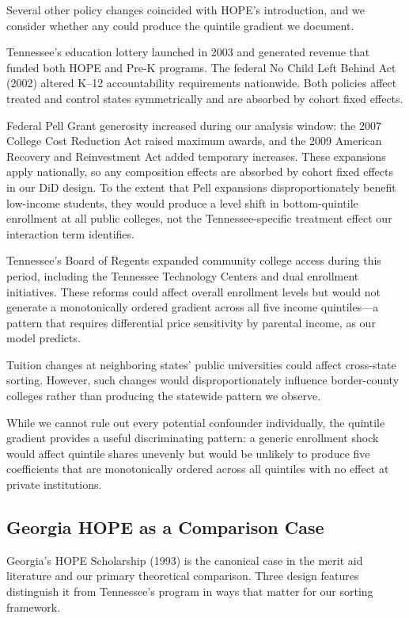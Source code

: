 Several other policy changes coincided with HOPE's introduction, and we
consider whether any could produce the quintile gradient we document.

Tennessee's education lottery launched in 2003 and generated revenue
that funded both HOPE and Pre-K programs. The federal No Child Left
Behind Act (2002) altered K--12 accountability requirements nationwide.
Both policies affect treated and control states symmetrically and are
absorbed by cohort fixed effects.

Federal Pell Grant generosity increased during our analysis window:
the 2007 College Cost Reduction Act raised maximum awards, and the
2009 American Recovery and Reinvestment Act added temporary increases.
These expansions apply nationally, so any composition effects are
absorbed by cohort fixed effects in our DiD design. To the extent
that Pell expansions disproportionately benefit low-income students,
they would produce a level shift in bottom-quintile enrollment at all
public colleges, not the Tennessee-specific treatment effect our
interaction term identifies.

Tennessee's Board of Regents expanded community college access during
this period, including the Tennessee Technology Centers and dual
enrollment initiatives. These reforms could affect overall enrollment
levels but would not generate a monotonically ordered gradient across
all five income quintiles---a pattern that requires differential price
sensitivity by parental income, as our model predicts.

Tuition changes at neighboring states' public universities could
affect cross-state sorting. However, such changes would
disproportionately influence border-county colleges rather than
producing the statewide pattern we observe.

While we cannot rule out every potential confounder individually, the
quintile gradient provides a useful discriminating pattern: a generic
enrollment shock would affect quintile shares unevenly but would be
unlikely to produce five coefficients that are monotonically ordered
across all quintiles with no effect at private institutions.

\subsection{Georgia HOPE as a Comparison Case}
\label{sec:background_georgia}

Georgia's HOPE Scholarship (1993) is the canonical case in the merit aid
literature \parencite{dynarski2000hope, song2024hope} and our primary
theoretical comparison. Three design features
distinguish it from Tennessee's program in ways that matter for our
sorting framework.

